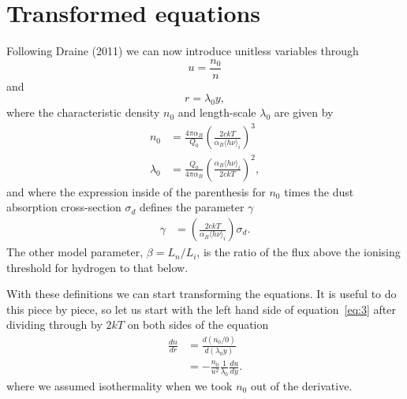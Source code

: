 \documentclass[11pt]{article}
\newcommand{\ddr}[1]{\frac{d#1}{dr}}
\newcommand{\ddy}[1]{\frac{d#1}{dy}}
\newcommand{\hnui}{\ensuremath{\langle h\nu\rangle_i}}
\begin{document}
\section{Transformed equations}
\label{sec:transf-equat}

Following Draine (2011) we can now introduce unitless variables through
\begin{equation}
  \label{eq:4}
  u = \frac{n_0}{n}
\end{equation}
and
\begin{equation}
  \label{eq:5}
  r = \lambda_0 y,
\end{equation}
where the characteristic density $n_0$ and length-scale $\lambda_0$ are given by
\begin{align}
  \label{eq:6}
  n_0 & = \frac{4\pi\alpha_B}{Q_0} \left(\frac{2 c kT}{\alpha_B \hnui}\right)^3\\
  \label{eq:6b}
  \lambda_0 & = \frac{Q_0}{4\pi \alpha_B}\left(\frac{\alpha_B\hnui}{2ckT}\right)^2,
\end{align}
and where the expression inside of the parenthesis for $n_0$ times the dust absorption cross-section $\sigma_d$ defines the parameter $\gamma$
\begin{align}
  \label{eq:7}
  \gamma & = \left(\frac{2 c kT}{\alpha_B \hnui}\right)\sigma_d.
\end{align}
The other model parameter, $\beta=L_n/L_i$, is the ratio of the flux above the ionising threshold for hydrogen to that below.

With these definitions we can start transforming the equations. It is useful to do this piece by piece, so let us start with the left hand side of equation~\eqref{eq:3} after dividing through by $2kT$ on both sides of the equation
\begin{align}
  \label{eq:8}
  \ddr{n} & = \frac{d(n_0/0)}{d(\lambda_0 y)} \\
          & = -\frac{n_0}{u^2} \frac{1}{\lambda_0} \ddy{u}.
\end{align}
where we assumed isothermality when we took $n_0$ out of the derivative.
\end{document}
